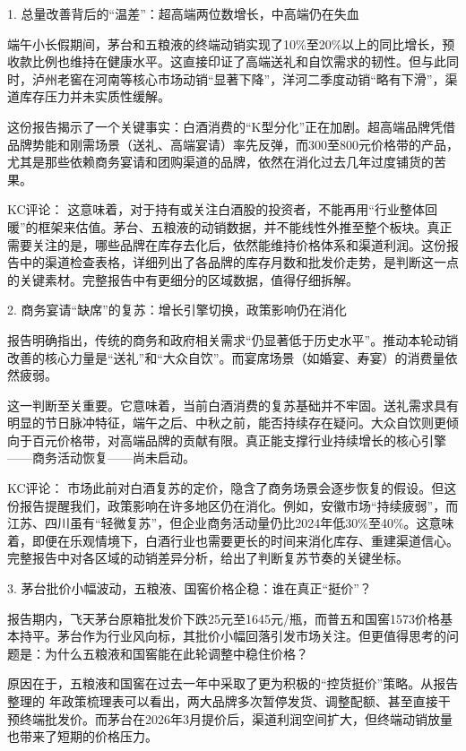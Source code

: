 \documentclass[11pt]{ctexart}
\begin{document}
1. 总量改善背后的“温差”：超高端两位数增长，中高端仍在失血

端午小长假期间，茅台和五粮液的终端动销实现了10\%至20\%以上的同比增长，预收款比例也维持在健康水平。这直接印证了高端送礼和自饮需求的韧性。但与此同时，泸州老窖在河南等核心市场动销“显著下降”，洋河二季度动销“略有下滑”，渠道库存压力并未实质性缓解。

这份报告揭示了一个关键事实：白酒消费的“K型分化”正在加剧。超高端品牌凭借品牌势能和刚需场景（送礼、高端宴请）率先反弹，而300至800元价格带的产品，尤其是那些依赖商务宴请和团购渠道的品牌，依然在消化过去几年过度铺货的苦果。

KC评论： 这意味着，对于持有或关注白酒股的投资者，不能再用“行业整体回暖”的框架来估值。茅台、五粮液的动销数据，并不能线性外推至整个板块。真正需要关注的是，哪些品牌在库存去化后，依然能维持价格体系和渠道利润。这份报告中的渠道检查表格，详细列出了各品牌的库存月数和批发价走势，是判断这一点的关键素材。完整报告中有更细分的区域数据，值得仔细拆解。

2. 商务宴请“缺席”的复苏：增长引擎切换，政策影响仍在消化

报告明确指出，传统的商务和政府相关需求“仍显著低于历史水平”。推动本轮动销改善的核心力量是“送礼”和“大众自饮”。而宴席场景（如婚宴、寿宴）的消费量依然疲弱。

这一判断至关重要。它意味着，当前白酒消费的复苏基础并不牢固。送礼需求具有明显的节日脉冲特征，端午之后、中秋之前，能否持续存在疑问。大众自饮则更倾向于百元价格带，对高端品牌的贡献有限。真正能支撑行业持续增长的核心引擎——商务活动恢复——尚未启动。

KC评论： 市场此前对白酒复苏的定价，隐含了商务场景会逐步恢复的假设。但这份报告提醒我们，政策影响在许多地区仍在消化。例如，安徽市场“持续疲弱”，而江苏、四川虽有“轻微复苏”，但企业商务活动量仍比2024年低30\%至40\%。这意味着，即便在乐观情境下，白酒行业也需要更长的时间来消化库存、重建渠道信心。完整报告中对各区域的动销差异分析，给出了判断复苏节奏的关键坐标。

3. 茅台批价小幅波动，五粮液、国窖价格企稳：谁在真正“挺价”？

报告期内，飞天茅台原箱批发价下跌25元至1645元/瓶，而普五和国窖1573价格基本持平。茅台作为行业风向标，其批价小幅回落引发市场关注。但更值得思考的问题是：为什么五粮液和国窖能在此轮调整中稳住价格？

原因在于，五粮液和国窖在过去一年中采取了更为积极的“控货挺价”策略。从报告整理的 年政策梳理表可以看出，两大品牌多次暂停发货、调整配额、甚至直接干预终端批发价。而茅台在2026年3月提价后，渠道利润空间扩大，但终端动销放量也带来了短期的价格压力。
\end{document}
